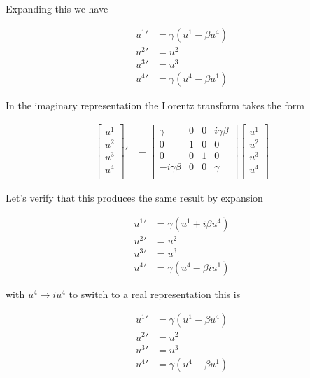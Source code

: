 Expanding this we have

\begin{align}\label{eqn:realRepresentationFourVector}
{u^1}' &= \gamma ( u^1 - \beta u^4) \\
{u^2}' &= {u^2} \\
{u^3}' &= {u^3} \\
{u^4}' &= \gamma ( u^4 - \beta u^1)
\end{align}

In the imaginary representation the Lorentz transform takes the form

\begin{align*}
{\begin{bmatrix}
u^1 \\
u^2 \\
u^3 \\
u^4 \\
\end{bmatrix}}'
&=
\begin{bmatrix}
\gamma & 0 & 0 & i \gamma \beta \\
0 & 1 & 0 & 0 \\
0 & 0 & 1 & 0 \\
- i \gamma \beta & 0 & 0 & \gamma \\
\end{bmatrix}
{\begin{bmatrix}
u^1 \\
u^2 \\
u^3 \\
u^4 \\
\end{bmatrix}} 
\end{align*}

Let's verify that this produces the same result by expansion

\begin{align*}
{u^1}' &= \gamma ( u^1 + i \beta u^4) \\
{u^2}' &= {u^2} \\
{u^3}' &= {u^3} \\
{u^4}' &= \gamma ( u^4 - \beta i u^1)
\end{align*}

with $u^4 \rightarrow i u^4$ to switch to a real representation this is

\begin{align*}
{u^1}' &= \gamma ( u^1 - \beta u^4) \\
{u^2}' &= {u^2} \\
{u^3}' &= {u^3} \\
{u^4}' &= \gamma ( u^4 - \beta u^1)
\end{align*}

